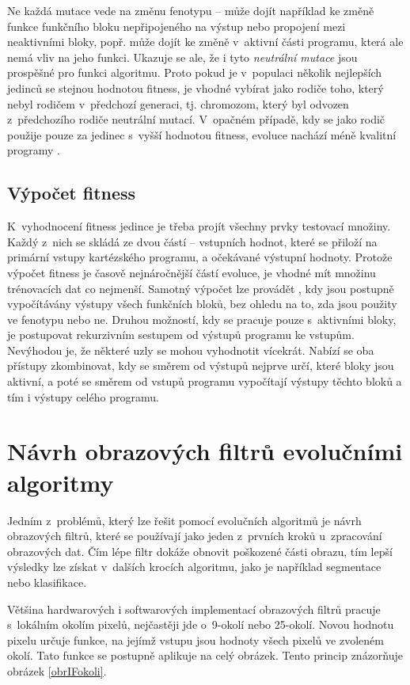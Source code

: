 Ne každá mutace vede na změnu fenotypu -- může dojít například ke změně funkce funkčního bloku nepřipojeného na výstup nebo propojení mezi neaktivními bloky, popř. může dojít ke změně v~aktivní části programu, která ale nemá vliv na jeho funkci. Ukazuje se ale, že i tyto \emph{neutrální mutace} jsou prospěšné pro funkci algoritmu. Proto pokud je v~populaci několik nejlepších jedinců se stejnou hodnotou fitness, je vhodné vybírat jako rodiče toho, který nebyl rodičem v~předchozí generaci, tj. chromozom, který byl odvozen z~předchozího rodiče neutrální mutací. V~opačném případě, kdy se jako rodič použije pouze za jedinec s~vyšší hodnotou fitness, evoluce nachází méně kvalitní programy \cite{ZelenaCGP, Modra}.


\subsection{Výpočet fitness}

K~vyhodnocení fitness jedince je třeba projít všechny prvky testovací množiny. Každý z~nich se skládá ze dvou částí -- vstupních hodnot, které se přiloží na primární vstupy kartézského programu, a očekávané výstupní hodnoty. Protože výpočet fitness je časově nejnáročnější částí evoluce, je vhodné mít množinu trénovacích dat co nejmenší. Samotný výpočet lze provádět , kdy jsou postupně vypočítávány výstupy všech funkčních bloků, bez ohledu na to, zda jsou použity ve fenotypu nebo ne. Druhou možností, kdy se pracuje pouze s~aktivními bloky, je postupovat rekurzivním sestupem od výstupů programu ke vstupům. Nevýhodou je, že některé uzly se mohou vyhodnotit vícekrát. Nabízí se oba přístupy zkombinovat, kdy se směrem od výstupů nejprve určí, které bloky jsou aktivní, a poté se směrem od vstupů programu vypočítají výstupy těchto bloků a tím i výstupy celého programu.

\section{Návrh obrazových filtrů evolučními algoritmy}
\label{secIF}

Jedním z~problémů, který lze řešit pomocí evolučních algoritmů je návrh obrazových filtrů, které se používají jako jeden z~prvních kroků u~zpracování obrazových dat. Čím lépe filtr dokáže obnovit poškozené části obrazu, tím lepší výsledky lze získat v~dalších krocích algoritmu, jako je například segmentace nebo klasifikace.

Většina hardwarových i softwarových implementací obrazových filtrů pracuje s~lokálním okolím pixelů, nejčastěji jde o~9-okolí nebo 25-okolí. Novou hodnotu pixelu určuje funkce, na jejímž vstupu jsou hodnoty všech pixelů ve zvoleném okolí. Tato funkce se postupně aplikuje na celý obrázek. Tento princip znázorňuje obrázek \ref{obrIFokoli}.

